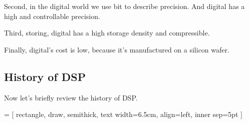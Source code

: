        Second, in the digital world we use bit to describe precision. 
        And digital has a high and controllable precision.
        
        Third, storing, digital has a high storage density and compressible.

        Finally, digital's cost is low, because it's manufactured on a silicon wafer.

    \newpage
    \subsection{History of DSP}
        Now let's briefly review the history of DSP.

        \inserttikzpicture
            {
                \def\amplitude{1.0}      %
                \def\quarterperiod{2.5}  %
                \def\numsteps{6}         %
                \def\linelength{1.5}     %
                \def\eventwidth{6.5cm}   %
                            
                 = [
                    rectangle, 
                    draw, 
                    semithick, 
                    text width=\eventwidth, 
                    align=left,             
                    inner sep=5pt
                    ]

}
